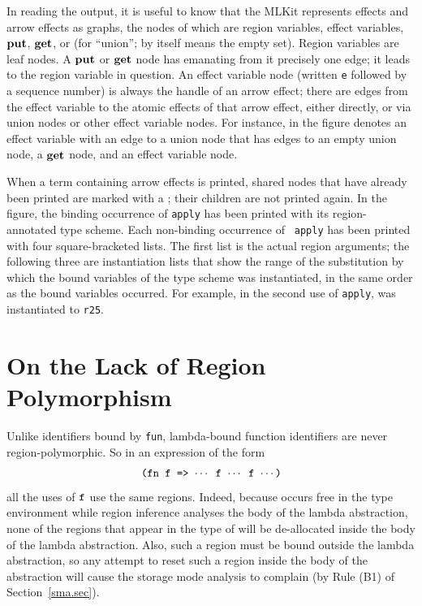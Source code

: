 \documentclass[12pt]{book}
\begin{document}
In reading the output, it is useful to know that the MLKit represents
effects and arrow effects as graphs, the nodes of which are region
variables, effect variables, $\mathop{\bf put}\nolimits$, $\mathop{\bf get}\nolimits$, or  (for
``union'';  by itself means the empty set).  Region variables
are leaf nodes. A $\mathop{\bf put}\nolimits$ or $\mathop{\bf get}\nolimits$ node has emanating from it
precisely one edge; it leads to the region variable in question.  An
effect variable node (written {\tt e} followed by a sequence number)
is always the handle of an arrow effect; there are edges from the
effect variable to the atomic effects of that arrow effect, either
directly, or via union nodes or other effect variable nodes.  For
instance,  in the figure denotes an
effect variable with an edge to a union node that has edges to an
empty union node, a $\mathop{\bf get}\nolimits$ node, and an effect variable node.

When a term containing arrow effects is printed, shared nodes that
have already been printed are marked with a ; their children
are not printed again. 
In the figure, the binding occurrence of {\tt apply} has been printed
with its region-annotated type scheme. Each non-binding occurrence of {\tt
  apply} has been printed with four square-bracketed lists. The first
list is the actual region arguments; the following three are
instantiation lists that show the range of the substitution by
which the bound variables of the type scheme was instantiated, in the
same order as the bound variables occurred.  For example, in the
second use of {\tt apply},  was instantiated to {\tt r25}.

\section{On the Lack of Region Polymorphism}
Unlike identifiers bound by {\tt fun}, lambda-bound function
identifiers are never region-polymorphic. So in an expression of the
form
$$\hbox{\tt (fn f => $\cdots$ f $\cdots$ f $\cdots$)}$$
all the uses of
$\hbox{\tt f}$ use the same regions. Indeed, because  occurs
free in the type environment while region inference analyses the body
of the lambda abstraction, none of the regions that appear in the type
of  will be de-allocated inside the body of the lambda
abstraction. Also, such a region must be bound outside the lambda
abstraction, so any attempt to reset such a region inside the body of
the abstraction will cause the storage mode analysis to complain (by
Rule (B1) of Section~\ref{sma.sec}).
\end{document}
